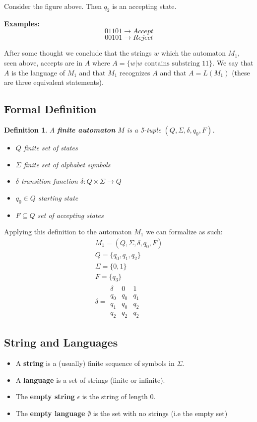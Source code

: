 \documentclass[12pt]{article}
\newtheorem{definition}{Definition}
\begin{document}
\noindent 
Consider the figure above. Then \(q_2\) is an accepting state. 

\noindent 
\textbf{Examples:}
\[ 
   01101 \to Accept
\]
\[ 
    00101 \to Reject
\]

\noindent 
After some thought we conclude that the strings \(w\) which the automaton \(M_1\), 
seen above, accepts are in \(A\) where \(A = \{w | w \text{ contains substring } 11\}\).
We say that \(A\) is the language of \(M_1\) and that \(M_1\) recognizes 
\(A\) and that \(A = L(M_1)\) (these are three equivalent statements).

\subsection*{Formal Definition} 
\begin{definition}
    A \textbf{finite automaton} \(M\) is a 5-tuple \((Q, \Sigma, \delta, q_0, F)\). 
    \begin{itemize}
        \item \(Q\) finite set of states 
        \item \(\Sigma\) finite set of alphabet symbols 
        \item \(\delta\) transition function \(\delta: Q \times \Sigma \to Q\) 
        \item \(q_0 \in Q\) starting state 
        \item \(F \subseteq Q\) set of accepting states 
    \end{itemize}
\end{definition}

\noindent 
Applying this definition to the automaton \(M_1\) we can formalize as such:  
\begin{gather*}
    M_1 = (Q, \Sigma, \delta, q_0, F) \\ 
    Q = \{q_0, q_1, q_2\} \\ 
    \Sigma = \{0, 1\} \\ 
    F = \{q_3\} \\ 
    \delta = 
    \begin{array}{c|cc}
        \delta & 0 & 1 \\
        \hline
        q_0 & q_0 & q_1 \\ 
        q_1 & q_0 & q_2 \\ 
        q_2 & q_2 & q_2 
    \end{array}
\end{gather*}

\subsection*{String and Languages}
\begin{itemize}
    \item A \textbf{string} is a (usually) finite sequence of symbols in \(\Sigma\). 
    \item A \textbf{language} is a set of strings (finite or infinite).
    \item The \textbf{empty string} \(\epsilon\) is the string of length 0.
    \item The \textbf{empty language} \(\emptyset\) is the set with no strings 
        (i.e the empty set)
\end{itemize}
\end{document}
